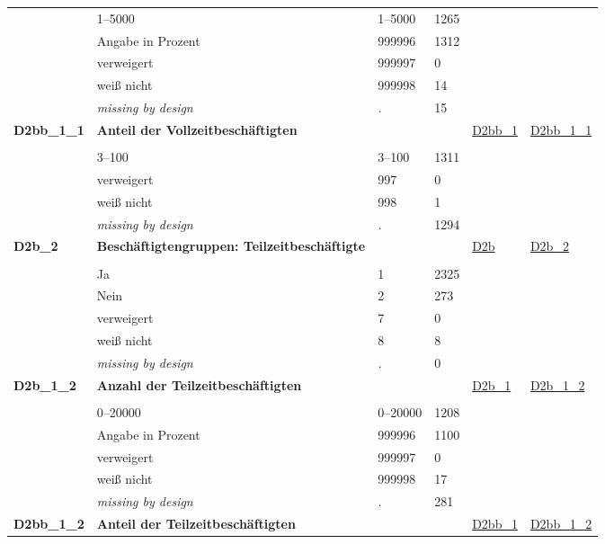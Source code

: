 \begin{longtable}{| L{2.45cm} | L{6cm} | C{1.5cm} | R{1cm} | C{2.25cm} | C{2.25cm} |}
   & 1--5000 & 1--5000 & 1265 &  &  \\ 
   & Angabe in Prozent & 999996 & 1312 &  &  \\ 
   & verweigert & 999997 & 0 &  &  \\ 
   & weiß nicht & 999998 & 14 &  &  \\ 
   & \textit{missing by design} & \textit{.} & 15 &  &  \\ 
   \midrule
\textbf{D2bb\_1\_1}\label{var:D2bb:1:1} & \textbf{Anteil der Vollzeitbeschäftigten} &  &  & \hyperref[D2bb:1]{D2bb\_1} & \hyperref[var:suf:D2bb:1:1]{D2bb\_1\_1} \\ 
   &  &  &  &  &  \\ 
   & 3--100 & 3--100 & 1311 &  &  \\ 
   & verweigert & 997 & 0 &  &  \\ 
   & weiß nicht & 998 & 1 &  &  \\ 
   & \textit{missing by design} & \textit{.} & 1294 &  &  \\ 
   \midrule
\textbf{D2b\_2}\label{var:D2b:2} & \textbf{Beschäftigtengruppen: Teilzeitbeschäftigte} &  &  & \hyperref[D2b]{D2b} & \hyperref[var:suf:D2b:2]{D2b\_2} \\ 
   &  &  &  &  &  \\ 
   & Ja & 1 & 2325 &  &  \\ 
   & Nein & 2 & 273 &  &  \\ 
   & verweigert & 7 & 0 &  &  \\ 
   & weiß nicht & 8 & 8 &  &  \\ 
   & \textit{missing by design} & \textit{.} & 0 &  &  \\ 
   \midrule
\textbf{D2b\_1\_2}\label{var:D2b:1:2} & \textbf{Anzahl der Teilzeitbeschäftigten} &  &  & \hyperref[D2b:1]{D2b\_1} & \hyperref[var:suf:D2b:1:2]{D2b\_1\_2} \\ 
   &  &  &  &  &  \\ 
   & 0--20000 & 0--20000 & 1208 &  &  \\ 
   & Angabe in Prozent & 999996 & 1100 &  &  \\ 
   & verweigert & 999997 & 0 &  &  \\ 
   & weiß nicht & 999998 & 17 &  &  \\ 
   & \textit{missing by design} & \textit{.} & 281 &  &  \\ 
   \midrule
\textbf{D2bb\_1\_2}\label{var:D2bb:1:2} & \textbf{Anteil der Teilzeitbeschäftigten} &  &  & \hyperref[D2bb:1]{D2bb\_1} & \hyperref[var:suf:D2bb:1:2]{D2bb\_1\_2} \\ 

\end{longtable}
